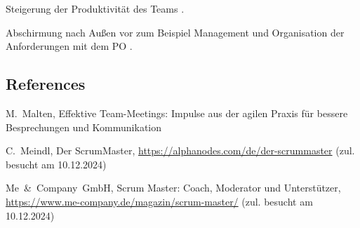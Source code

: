 \documentclass[5pt, final]{beamer}
\begin{document}
\begin{frame}[t]
\begin{multicols}{3}
			Steigerung der Produktivität des Teams \cite{vantighem24}.
			
			Abschirmung nach Außen vor zum Beispiel Management und Organisation der Anforderungen mit dem PO \cite{meindl12}.
			
			
			
			
			\subsection{References}
						
			\begin{thebibliography}{99}
				
%				
%				
				
				 M.~Malten, Effektive Team-Meetings: Impulse aus der agilen Praxis für bessere Besprechungen und Kommunikation
				
				 C.~Meindl, Der ScrumMaster, \url{https://alphanodes.com/de/der-scrummaster} (zul. besucht am 10.12.2024)
				
				 Me~\&~Company~GmbH, Scrum Master: Coach, Moderator und Unterstützer, \url{https://www.me-company.de/magazin/scrum-master/} (zul. besucht am 10.12.2024)
				

\end{thebibliography}
\end{multicols}
\end{frame}
\end{document}
